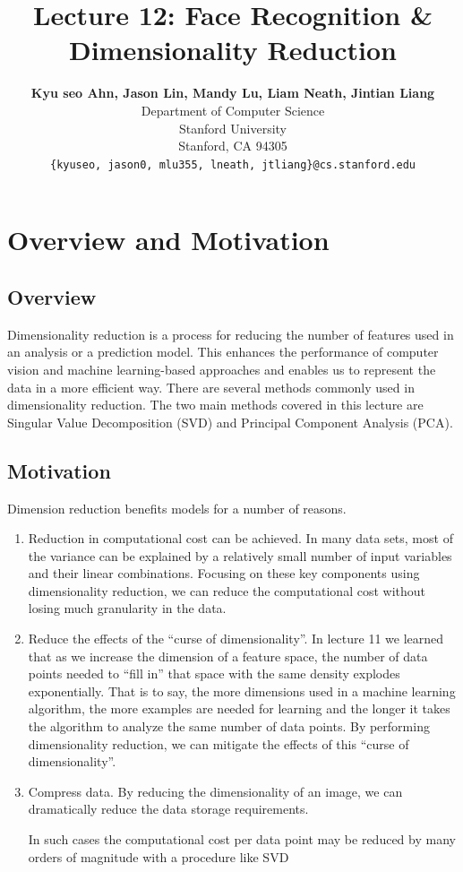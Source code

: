 \documentclass{article}
\title{Lecture 12: Face Recognition \& Dimensionality Reduction}
\author{
  \textbf{Kyu seo Ahn, Jason Lin, Mandy Lu, Liam Neath, Jintian Liang} \\
  Department of Computer Science\\
  Stanford University\\
  Stanford, CA 94305 \\
  \texttt{\{kyuseo, jason0, mlu355, lneath, jtliang\}@cs.stanford.edu} \\
}
\begin{document}
\maketitle

\section{Overview and Motivation}
\subsection{Overview}
Dimensionality reduction is a process for reducing the number of features used in an analysis or a prediction model. This enhances the performance of computer vision and machine learning-based approaches and enables us to represent the data in a more efficient way. There are several methods commonly used in dimensionality reduction. The two main methods covered in this lecture are Singular Value Decomposition (SVD) and Principal Component Analysis (PCA). 

\subsection{Motivation}
Dimension reduction benefits models for a number of reasons.\\
\begin{enumerate}
\item Reduction in computational cost can be achieved. In many data sets, most of the variance can be explained by a relatively small number of input variables and their linear combinations. Focusing on these key components using dimensionality reduction, we can reduce the computational cost without losing much granularity in the data.

\item Reduce the effects of the “curse of dimensionality”. In lecture 11 we learned that as we increase the dimension of a feature space, the number of data points needed to “fill in” that space with the same density explodes exponentially. That is to say, the more dimensions used in a machine learning algorithm, the more examples are needed for learning and the longer it takes the algorithm to analyze the same number of data points. By performing dimensionality reduction, we can mitigate the effects of this “curse of dimensionality”.

\item Compress data. By reducing the dimensionality of an image, we can dramatically reduce the data storage requirements. 

In such cases the computational cost per data point may be reduced by many orders of magnitude with a procedure like SVD 
\end{enumerate}
\end{document}
